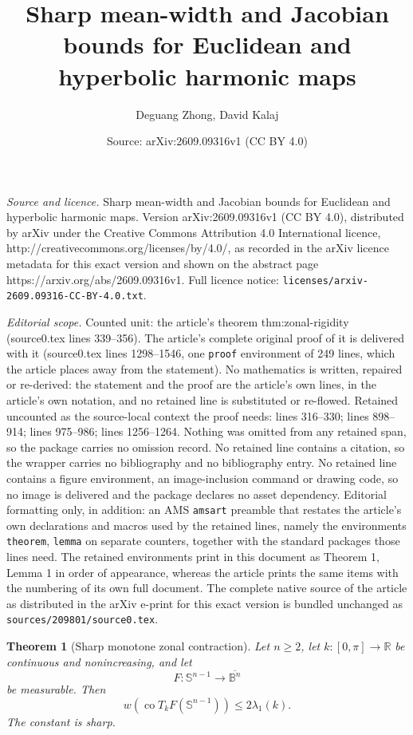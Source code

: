\documentclass[10pt,a4paper]{amsart}
\title{Sharp mean-width and Jacobian bounds for Euclidean and hyperbolic harmonic maps}
\author{Deguang Zhong, David Kalaj}
\date{Source: arXiv:2609.09316v1 (CC BY 4.0)}
\newtheorem{theorem}{Theorem}
\begin{document}
\maketitle

\noindent\emph{Source and licence.} Sharp mean-width and Jacobian bounds for Euclidean and hyperbolic harmonic maps. Version arXiv:2609.09316v1 (CC BY 4.0), distributed by arXiv under the Creative Commons Attribution 4.0 International licence, http://creativecommons.org/licenses/by/4.0/, as recorded in the arXiv licence metadata for this exact version and shown on the abstract page https://arxiv.org/abs/2609.09316v1. Full licence notice: \texttt{licenses/arxiv-2609.09316-CC-BY-4.0.txt}.\par\smallskip

\noindent\textit{Editorial scope.} Counted unit: the article's theorem thm:zonal-rigidity (source0.tex lines 339--356). The article's complete original proof of it is delivered with it (source0.tex lines 1298--1546, one \texttt{proof} environment of 249 lines, which the article places away from the statement). No mathematics is written, repaired or re-derived: the statement and the proof are the article's own lines, in the article's own notation, and no retained line is substituted or re-flowed.  Retained uncounted as the source-local context the proof needs: lines 316--330; lines 898--914; lines 975--986; lines 1256--1264.  Nothing was omitted from any retained span, so the package carries no omission record.  No retained line contains a citation, so the wrapper carries no bibliography and no bibliography entry.  No retained line contains a figure environment, an image-inclusion command or drawing code, so no image is delivered and the package declares no asset dependency.  Editorial formatting only, in addition: an AMS \texttt{amsart} preamble that restates the article's own declarations and macros used by the retained lines, namely the environments \texttt{theorem}, \texttt{lemma} on separate counters, together with the standard packages those lines need.  The retained environments print in this document as Theorem 1, Lemma 1 in order of appearance, whereas the article prints the same items with the numbering of its own full document.  The complete native source of the article as distributed in the arXiv e-print for this exact version is bundled unchanged as \texttt{sources/209801/source0.tex}.
\begin{theorem}[Sharp monotone zonal contraction]\label{thm:zonal-main}
Let $n\ge2$, let $k:[0,\pi]\to\mathbb R$ be continuous and nonincreasing,
and let
\[
 F:\mathbb S^{n-1}\to\overline{\mathbb B^n}
\]
be measurable.  Then
\begin{equation}\label{eq:zonal-main}
 w\!\left(
 \operatorname{co}T_kF(\mathbb S^{n-1})
 \right)
 \le2\lambda_1(k).
\end{equation}
The constant is sharp.
\end{theorem}
\end{document}

